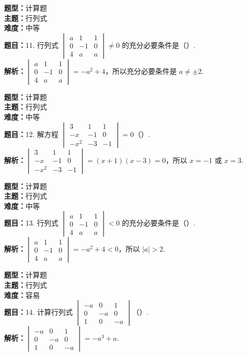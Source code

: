 \documentclass{ctexart}
\newenvironment{question}[5]{%
	\noindent\textbf{题型：}#1\\
	\textbf{主题：}#2\\
	\textbf{难度：}#3\\
	\textbf{题目：}#4\\
	\textbf{解析：}#5\\
	\vspace{1em}
}{}
\begin{document}
	\begin{question} 
		{计算题} 
		{行列式}
		{中等}
		{11. 行列式 \(\begin{vmatrix} a & 1 & 1 \\ 0 & -1 & 0 \\ 4 & a & a\end{vmatrix} \neq 0\) 的充分必要条件是（）. }
		{\(\begin{vmatrix} a & 1 & 1 \\ 0 & -1 & 0 \\ 4 & a & a\end{vmatrix} = -a^2 + 4\)，所以充分必要条件是 \(a \neq \pm2\). }
	\end{question}
	
	\begin{question} 
		{计算题} 
		{行列式}
		{中等}
		{12. 解方程 \(\begin{vmatrix} 3 & 1 & 1 \\ -x & -1 & 0 \\ -x^2 & -3 & -1\end{vmatrix}=0\)（）. }
		{\(\begin{vmatrix} 3 & 1 & 1 \\ -x & -1 & 0 \\ -x^2 & -3 & -1\end{vmatrix} = (x+1)(x-3) = 0\)，所以 \(x = -1\) 或 \(x = 3\). }
	\end{question}
	
	\begin{question} 
		{计算题} 
		{行列式}
		{中等}
		{13. 行列式 \(\begin{vmatrix} a & 1 & 1 \\ 0 & -1 & 0 \\ 4 & a & a\end{vmatrix}<0\) 的充分必要条件是（）. }
		{\(\begin{vmatrix} a & 1 & 1 \\ 0 & -1 & 0 \\ 4 & a & a\end{vmatrix} = -a^2 + 4 < 0\)，所以 \(|a| > 2\). }
	\end{question}
	
	\begin{question} 
		{计算题} 
		{行列式}
		{容易}
		{14. 计算行列式 \(\begin{vmatrix} -a & 0 & 1 \\ 0 & -a & 0 \\ 1 & 0 & -a\end{vmatrix}\)（）. }
		{\(\begin{vmatrix} -a & 0 & 1 \\ 0 & -a & 0 \\ 1 & 0 & -a\end{vmatrix} = -a^3 + a\). }
	\end{question}
	
\end{document}
